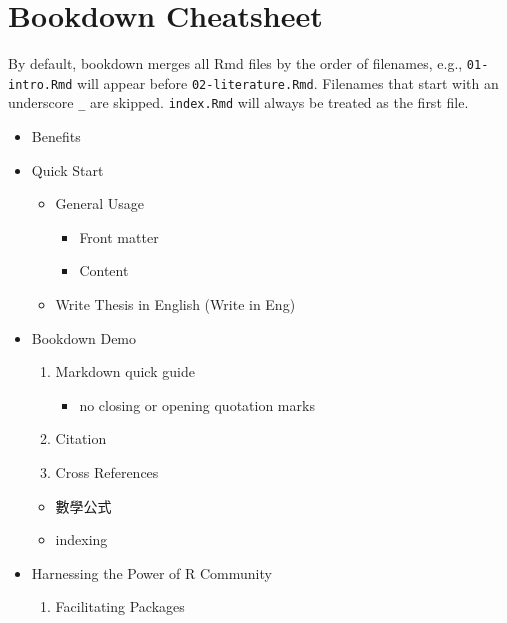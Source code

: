 \documentclass[oneside]{book}
\providecommand{\tightlist}{%
  \setlength{\itemsep}{0pt}\setlength{\parskip}{0pt}}
\begin{document}
\chapter{Bookdown Cheatsheet}\label{bookdown-cheatsheet}

By default, bookdown merges all Rmd files by the order of filenames,
e.g., \texttt{01-intro.Rmd} will appear before
\texttt{02-literature.Rmd}. Filenames that start with an underscore
\texttt{\_} are skipped. \texttt{index.Rmd} will always be treated as
the first file.

\begin{itemize}
\tightlist
\item
  Benefits
\item
  Quick Start

  \begin{itemize}
  \tightlist
  \item
    General Usage

    \begin{itemize}
    \tightlist
    \item
      Front matter
    \item
      Content
    \end{itemize}
  \item
    Write Thesis in English (Write in Eng)
  \end{itemize}
\item
  Bookdown Demo

  \begin{enumerate}
  \def\labelenumi{\alph{enumi})}
  \tightlist
  \item
    Markdown quick guide

    \begin{itemize}
    \tightlist
    \item
      no closing or opening quotation marks
    \end{itemize}
  \item
    Citation
  \item
    Cross References
  \end{enumerate}

  \begin{itemize}
  \tightlist
  \item
    數學公式
  \item
    indexing
  \end{itemize}
\item
  Harnessing the Power of R Community

  \begin{enumerate}
  \def\labelenumi{\Alph{enumi})}
  \tightlist
  \item
    Facilitating Packages


\end{enumerate}
\end{itemize}
\end{document}
